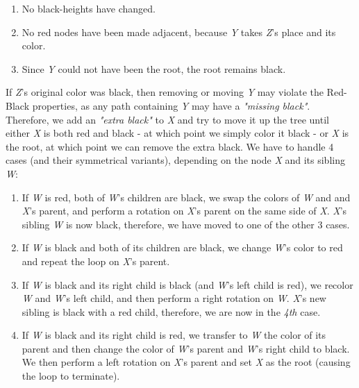 \documentclass[12pt]{article}
\begin{document}
    \begin{enumerate}
        \item No black-heights have changed.
        \item No red nodes have been made adjacent, because \textit{Y} takes \textit{Z}'s place and its color.
        \item Since \textit{Y} could not have been the root, the root remains black.
    \end{enumerate}
If \textit{Z}'s original color was black, then removing or moving \textit{Y} may violate the Red-Black properties,
    as any path containing \textit{Y} may have a \textit{"missing black"}. \newline
    Therefore, we add an \textit{"extra black"} to \textit{X} and try to move it up the tree until either
    \textit{X} is both red and black - at which point we simply color it black - or \textit{X} is the root, at which
    point we can remove the extra black. \newline
    We have to handle 4 cases (and their symmetrical variants), depending on the node \textit{X}
    and its sibling \textit{W}:
    \begin{enumerate}
        \item If \textit{W} is red, both of \textit{W}'s children are black, we swap the colors of \textit{W} and
        and \textit{X}'s parent, and perform a rotation on \textit{X}'s parent on the same side of \textit{X}. \newline
        \textit{X}'s sibling \textit{W} is now black, therefore, we have moved to one of the other 3 cases.
        \item If \textit{W} is black and both of its children are black, we change \textit{W}'s color to red and repeat
        the loop on \textit{X}'s parent.
        \item If \textit{W} is black and its right child is black (and \textit{W}'s left child is red),
        we recolor \textit{W} and \textit{W}'s left child, and then perform a right rotation on \textit{W}.
        \textit{X}'s new sibling is black with a red child, therefore, we are now in the \textit{4th} case.
        \item If \textit{W} is black and its right child is red, we transfer to \textit{W} the color of its parent and
        then change the color of \textit{W}'s parent and \textit{W}'s right child to black. \newline
        We then perform a left rotation on \textit{X}'s parent and set \textit{X} as the root
        (causing the loop to terminate).
    \end{enumerate}
\end{document}
